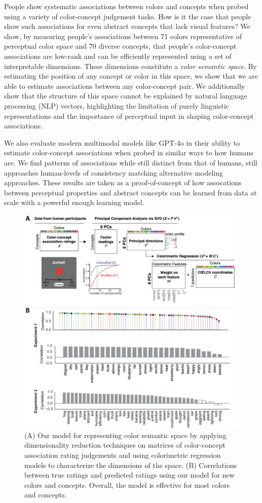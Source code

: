 \documentclass{Dissertate}
\begin{document}
People show systematic associations between colors and concepts when probed using a variety of color-concept judgement tasks.
How is it the case that people show such associations for even abstract concepts that lack visual features?
We show, by measuring people's associations between 71 colors representative of perceptual color space and 70 diverse concepts, that people's color-concept associations are low-rank and can be efficiently represented using a set of interpretable dimensions.
These dimensions constitute a \textit{color semantic space}.
By estimating the position of any concept or color in this space, we show that we are able to estimate associations between any color-concept pair.
We additionally show that the structure of this space cannot be explained by natural language processing (NLP) vectors, highlighting the limitation of purely linguistic representations and the importance of perceptual input in shaping color-concept associations.

We also evaluate modern multimodal models like GPT-4o in their ability to estimate color-concept associations when probed in similar ways to how humans are. 
We find patterns of associations while still distinct from that of humans, still approaches human-levels of consistency matching alternative modeling approaches.
These results are taken as a proof-of-concept of how assocations between perceptual properties and abstract concepts can be learned from data at scale with a powerful enough learning model.

\begin{figure}[htpb!]
    \centering
    \includegraphics[width=.8\linewidth]{proposal/figures/chap1.pdf}
    \caption{(A) Our model for representing color semantic space by applying dimensionality reduction techniques on matrices of color-concept association rating judgements and using colorimetric regression models to characterize the dimensions of the space. (B) Correlations between true ratings and predicted ratings using our model for new colors and concepts. Overall, the model is effective for most colors and concepts.}
    \label{fig:chap1}
\end{figure}
\end{document}
